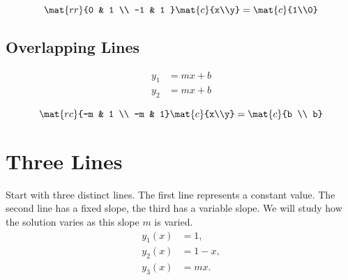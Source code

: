   \begin{equation*}   %
      \mat{rr}{0 & 1 \\ -1 & 1 }\mat{c}{x\\y} = \mat{c}{1\\0}
  \end{equation*}

\subsection{Overlapping Lines}  %

  \begin{equation*}   %
    \begin{split}
      y_{1} &= mx + b \\
      y_{2} &= mx + b
    \end{split}
  \end{equation*}

  \begin{equation*}   %
    \mat{rc}{-m & 1 \\ -m & 1} \mat{c}{x\\y} = \mat{c}{b \\ b}
  \end{equation*}


\section{Three Lines}  %
Start with three distinct lines. The first line represents a constant value. The second line has a fixed slope, the third has a variable slope. We will study how the solution varies as this slope $m$ is varied.
  \begin{equation*}   %
     \begin{split}
       y_{1}(x) &= 1, \\
       y_{2}(x) &= 1 - x, \\
       y_{3}(x) &= m x.
     \end{split}
  \end{equation*}


